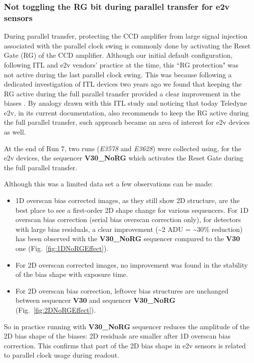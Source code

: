 \subsubsection{Not toggling the RG bit during parallel transfer for e2v sensors}\label{noRGe2v}
During parallel transfer, protecting the CCD amplifier from large signal injection associated with the parallel clock swing is commonly done by activating the Reset Gate (RG) of the CCD amplifier. Although our initial default configuration, following ITL and e2v vendors' practice at the time, this ``RG protection" was not active during the last parallel clock swing.  This was because 
following a dedicated investigation of ITL devices two years ago we found that keeping the RG active during the full parallel transfer provided a clear improvement in the biases \citep{2024SPIE13103E..0WU}. 
By analogy drawn with this ITL study and noticing that today Teledyne e2v, in its current documentation, also recommends to keep the  RG active during the full parallel transfer, such approach  became an area of interest for e2v devices as well. 

At the end of Run 7, two runs ({\it E3578} and {\it E3628}) were collected using, for the e2v devices, the  sequencer {\bf V30\_NoRG}  which activates the Reset Gate during the full parallel transfer. 

Although this was a limited data set a few observations can be made: 
\begin{itemize}
    \item  1D overscan bias corrected images, as they still show 2D structure, are the best place to see a first-order  2D shape change for various sequencers. For 1D overscan bias correction (serial bias overscan correction only), for detectors with large  bias residuals, a clear improvement (\textasciitilde2 ADU = \textasciitilde 30\% reduction) has been observed with the {\bf V30\_NoRG} sequencer compared to the {\bf V30} one (Fig.~\ref{fig:1DNoRGEffect}).
    \item For 2D overscan corrected images, no improvement was found in the stability of the bias shape with exposure time.  
    \item For 2D overscan bias correction, leftover bias structures  are unchanged between  sequencer {\bf V30} and sequencer {\bf V30\_NoRG} (Fig.~\ref{fig:2DNoRGEffect}).

\end{itemize}

So in practice running with {\bf V30\_NoRG} sequencer  reduces the amplitude of the 2D bias shape of the biases: 2D residuals are smaller after 1D overscan bias correction.  This confirms that part of the 2D bias shape in e2v sensors is related to parallel clock usage during readout. 

